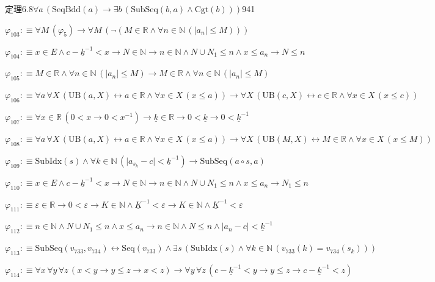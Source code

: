 \begin{fullproof}{定理6.8}{$\forall a\,(\mathrm{SeqBdd}(a) \to \exists b\,(\mathrm{SubSeq}(b,a) \land \mathrm{Cgt}(b)))$}{941}
\begin{abbrevlist}
\item $\varphi_{103} :\equiv \forall M\,(\varphi_{5}) \to \forall M\,(\neg (M \in \mathbb{R} \land \forall n \in \mathbb{N}\,(\lvert a_{n} \rvert \leq M)))$
\item $\varphi_{104} :\equiv x \in E \land c - \underline{k}^{-1} < x \to N \in \mathbb{N} \to n \in \mathbb{N} \land N \cup N_{1} \leq n \land x \leq a_{n} \to N \leq n$
\item $\varphi_{105} :\equiv M \in \mathbb{R} \land \forall n \in \mathbb{N}\,(\lvert a_{n} \rvert \leq M) \to M \in \mathbb{R} \land \forall n \in \mathbb{N}\,(\lvert a_{n} \rvert \leq M)$
\item $\varphi_{106} :\equiv \forall a\,\forall X\,(\mathrm{UB}(a,X) \leftrightarrow a \in \mathbb{R} \land \forall x \in X\,(x \leq a)) \to \forall X\,(\mathrm{UB}(c,X) \leftrightarrow c \in \mathbb{R} \land \forall x \in X\,(x \leq c))$
\item $\varphi_{107} :\equiv \forall x \in \mathbb{R}\,(0 < x \to 0 < x^{-1}) \to \underline{k} \in \mathbb{R} \to 0 < \underline{k} \to 0 < \underline{k}^{-1}$
\item $\varphi_{108} :\equiv \forall a\,\forall X\,(\mathrm{UB}(a,X) \leftrightarrow a \in \mathbb{R} \land \forall x \in X\,(x \leq a)) \to \forall X\,(\mathrm{UB}(M,X) \leftrightarrow M \in \mathbb{R} \land \forall x \in X\,(x \leq M))$
\item $\varphi_{109} :\equiv \mathrm{SubIdx}(s) \land \forall k \in \mathbb{N}\,(\lvert a_{s_{k}} - c \rvert < \underline{k}^{-1}) \to \mathrm{SubSeq}(a \circ s,a)$
\item $\varphi_{110} :\equiv x \in E \land c - \underline{k}^{-1} < x \to N \in \mathbb{N} \to n \in \mathbb{N} \land N \cup N_{1} \leq n \land x \leq a_{n} \to N_{1} \leq n$
\item $\varphi_{111} :\equiv \varepsilon \in \mathbb{R} \to 0 < \varepsilon \to K \in \mathbb{N} \land \underline{K}^{-1} < \varepsilon \to K \in \mathbb{N} \land \underline{K}^{-1} < \varepsilon$
\item $\varphi_{112} :\equiv n \in \mathbb{N} \land N \cup N_{1} \leq n \land x \leq a_{n} \to n \in \mathbb{N} \land N \leq n \land \lvert a_{n} - c \rvert < \underline{k}^{-1}$
\item $\varphi_{113} :\equiv \mathrm{SubSeq}(v_{733},v_{734}) \leftrightarrow \mathrm{Seq}(v_{733}) \land \exists s\,(\mathrm{SubIdx}(s) \land \forall k \in \mathbb{N}\,(v_{733}(k) = v_{734}(s_{k})))$
\item $\varphi_{114} :\equiv \forall x\,\forall y\,\forall z\,(x < y \to y \leq z \to x < z) \to \forall y\,\forall z\,(c - \underline{k}^{-1} < y \to y \leq z \to c - \underline{k}^{-1} < z)$

\end{abbrevlist}
\end{fullproof}
